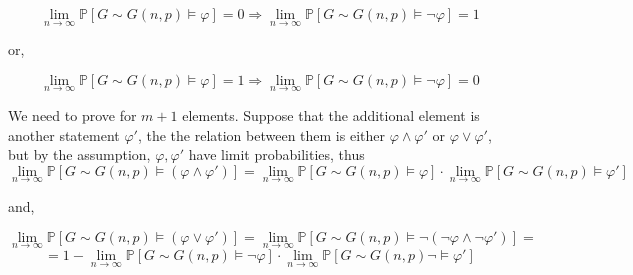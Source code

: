 \documentclass{article}
\begin{document}
\[\lim_{n\rightarrow\infty}\mathbb{P}[G\sim{G(n,p)\vDash\varphi}]=0\Rightarrow\lim_{n\rightarrow\infty}\mathbb{P}[G\sim{G(n,p)\vDash\neg\varphi}]=1\]

or,

\[\lim_{n\rightarrow\infty}\mathbb{P}[G\sim{G(n,p)\vDash\varphi}]=1\Rightarrow\lim_{n\rightarrow\infty}\mathbb{P}[G\sim{G(n,p)\vDash\neg\varphi}]=0\]

We need to prove for $m+1$ elements. Suppose that the additional element is another statement $\varphi'$, the the relation between them is either $\varphi\land\varphi'$ or $\varphi\lor\varphi'$, but by the assumption, $\varphi,\varphi'$ have limit probabilities, thus \[\lim_{n\rightarrow\infty
}\mathbb{P}[G\sim{G(n,p)}\vDash(\varphi\land\varphi')]=\lim_{n\rightarrow\infty
}\mathbb{P}[G\sim{G(n,p)}\vDash\varphi]\cdot\lim_{n\rightarrow\infty
}\mathbb{P}[G\sim{G(n,p)}\vDash\varphi']\]

and,

\[\lim_{n\rightarrow\infty
}\mathbb{P}[G\sim{G(n,p)}\vDash(\varphi\lor\varphi')]=\lim_{n\rightarrow\infty
}\mathbb{P}[G\sim{G(n,p)}\vDash\neg(\neg\varphi\land\neg\varphi')]=\]\[=1-\lim_{n\rightarrow\infty
}\mathbb{P}[G\sim{G(n,p)}\vDash\neg\varphi]\cdot\lim_{n\rightarrow\infty
}\mathbb{P}[G\sim{G(n,p)}\neg\vDash\varphi']\]
\end{document}
